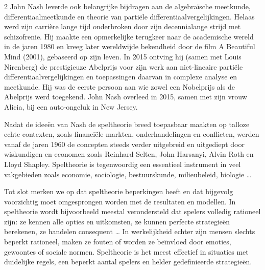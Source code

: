 \begin{multicols}{2}
John Nash leverde ook belangrijke bijdragen aan de algebraïsche meetkunde, differentiaalmeetkunde en theorie van partiële differentiaalvergelijkingen. Helaas werd zijn carrière lange tijd onderbroken door zijn decennialange strijd met schizofrenie. Hij maakte een opmerkelijke terugkeer naar de academische wereld in de jaren 1980 en kreeg later wereldwijde bekendheid door de film A Beautiful Mind (2001), gebaseerd op zijn leven. In 2015 ontving hij (samen met Louis Nirenberg) de prestigieuze Abelprijs voor zijn werk aan niet-lineaire partiële differentiaalvergelijkingen en toepassingen daarvan in complexe analyse en meetkunde. Hij  was de eerste persoon aan wie zowel een Nobelprijs als de Abelprijs werd toegekend. John Nash overleed in 2015, samen met zijn vrouw Alicia, bij een auto-ongeluk in New Jersey.

Nadat de ideeën van Nash de speltheorie breed toepasbaar maakten op talloze echte contexten, zoals financiële markten, onderhandelingen en conflicten, werden vanaf de jaren 1960 de concepten steeds verder uitgebreid en uitgediept door wiskundigen en economen zoals Reinhard Selten, John Harsanyi, Alvin Roth en Lloyd Shapley. Speltheorie is tegenwoordig een essentieel instrument in veel vakgebieden zoals economie, sociologie, bestuurskunde, milieubeleid, biologie …

Tot slot merken we op dat speltheorie beperkingen heeft en dat bijgevolg voorzichtig moet omgesprongen worden met de resultaten en modellen. In speltheorie wordt bijvoorbeeld meestal verondersteld dat spelers volledig rationeel zijn: ze kennen alle opties en uitkomsten, ze kunnen perfecte strategieën berekenen, ze handelen consequent … In werkelijkheid echter zijn mensen slechts beperkt rationeel, maken ze fouten of worden ze beïnvloed door emoties, gewoontes of sociale normen. Speltheorie is het meest effectief in situaties met duidelijke regels, een beperkt aantal spelers en helder gedefinieerde strategieën.
\stopcontents[inhoudloep]		%
\end{multicols}

